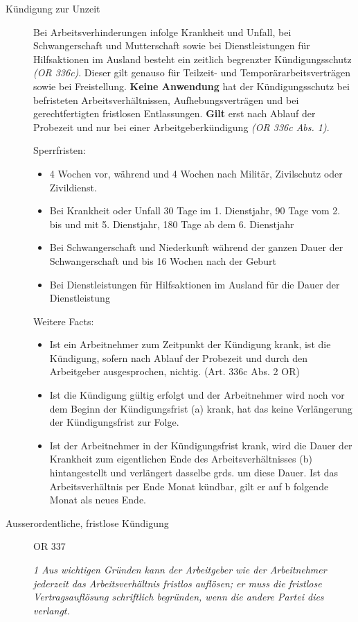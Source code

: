 \begin{description}
  \item[Kündigung zur Unzeit] Bei Arbeitsverhinderungen infolge Krankheit und
Unfall, bei Schwangerschaft und Mutterschaft sowie bei Dienstleistungen für Hilfsaktionen
im Ausland besteht ein zeitlich begrenzter Kündigungsschutz \textit{(OR 336c)}. Dieser gilt genauso für Teilzeit- und Temporärarbeitsverträgen sowie bei Freistellung.
\textbf{Keine Anwendung} hat der Kündigungsschutz bei befristeten Arbeitsverhältnissen, Aufhebungsverträgen und bei gerechtfertigten fristlosen Entlassungen.
\textbf{Gilt} erst nach Ablauf der Probezeit und nur bei einer Arbeitgeberkündigung \textit{(OR 336c Abs. 1)}.

Sperrfristen: 
\begin{itemize}
  \item 4 Wochen vor, während und 4 Wochen nach Militär, Zivilschutz oder Zivildienst. 
  \item Bei Krankheit oder Unfall 30 Tage im 1. Dienstjahr, 90 Tage vom 2. bis und mit 5. Dienstjahr, 180 Tage ab dem 6. Dienstjahr
  \item Bei Schwangerschaft und Niederkunft während der ganzen Dauer der Schwangerschaft und bis 16 Wochen nach der Geburt
  \item Bei Dienstleistungen für Hilfsaktionen im Ausland für die Dauer der Dienstleistung
\end{itemize}
Weitere Facts: 
\begin{itemize}
  \item Ist ein Arbeitnehmer zum Zeitpunkt der Kündigung krank, ist die Kündigung, sofern nach Ablauf der Probezeit und durch den Arbeitgeber ausgesprochen, nichtig. (Art. 336c Abs. 2 OR)
  \item Ist die Kündigung gültig erfolgt und der Arbeitnehmer wird noch vor dem Beginn der Kündigungsfrist (a) krank, hat das keine Verlängerung der Kündigungsfrist zur Folge.
  \item Ist der Arbeitnehmer in der Kündigungsfrist krank, wird die Dauer der Krankheit zum eigentlichen Ende des Arbeitsverhältnisses (b) hintangestellt und verlängert dasselbe grds. um diese Dauer. Ist das Arbeitsverhältnis per Ende Monat kündbar, gilt er auf b folgende Monat als neues Ende.
\end{itemize}
\item[Ausserordentliche, fristlose Kündigung] OR 337

  \textit{1 Aus wichtigen Gründen kann der Arbeitgeber wie der Arbeitnehmer jederzeit das Arbeitsverhältnis fristlos auflösen; er muss die fristlose Vertragsauflösung schriftlich begründen, wenn die andere Partei dies verlangt.}


\end{description}
